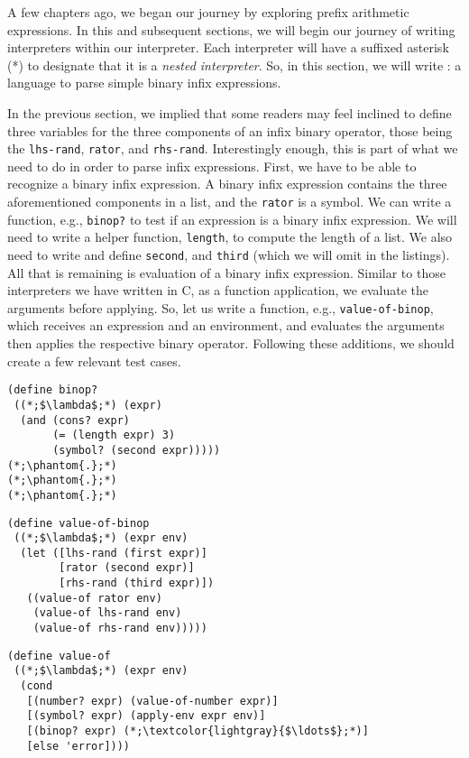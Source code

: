 A few chapters ago, we began our journey by exploring prefix arithmetic expressions. In this and subsequent sections, we will begin our journey of writing interpreters within our interpreter. Each interpreter will have a suffixed asterisk (*) to designate that it is a \textit{nested interpreter}. So, in this section, we will write : a language to parse simple binary infix expressions.

In the previous section, we implied that some readers may feel inclined to define three variables for the three components of an infix binary operator, those being the \texttt{lhs-rand}, \texttt{rator}, and \texttt{rhs-rand}. Interestingly enough, this is part of what we need to do in order to parse infix expressions. First, we have to be able to recognize a binary infix expression. A binary infix expression contains the three aforementioned components in a list, and the \texttt{rator} is a symbol. We can write a function, e.g., \texttt{binop?} to test if an expression is a binary infix expression. We will need to write a helper function, \texttt{length}, to compute the length of a list. We also need to write and define \texttt{second}, and \texttt{third} (which we will omit in the listings). All that is remaining is evaluation of a binary infix expression. Similar to those interpreters we have written in C, as a function application, we evaluate the arguments before applying. So, let us write a function, e.g., \texttt{value-of-binop}, which receives an expression and an environment, and evaluates the arguments then applies the respective binary operator. Following these additions, we should create a few relevant test cases.

\begin{clrr}[]{}\begin{lstlisting}[language=MyScheme]
(define binop?
 ((*;$\lambda$;*) (expr)
  (and (cons? expr) 
       (= (length expr) 3) 
       (symbol? (second expr)))))
(*;\phantom{.};*)
(*;\phantom{.};*)
(*;\phantom{.};*)
\end{lstlisting}
\tcblower
\begin{lstlisting}[language=MyNLNScheme]
(define value-of-binop
 ((*;$\lambda$;*) (expr env)
  (let ([lhs-rand (first expr)]
        [rator (second expr)]
        [rhs-rand (third expr)])
   ((value-of rator env)
    (value-of lhs-rand env)
    (value-of rhs-rand env)))))
\end{lstlisting}
\end{clrr}
\begin{cl}[]{}\begin{lstlisting}[language=MyScheme]
(define value-of
 ((*;$\lambda$;*) (expr env)
  (cond
   [(number? expr) (value-of-number expr)]
   [(symbol? expr) (apply-env expr env)]
   [(binop? expr) (*;\textcolor{lightgray}{$\ldots$};*)]
   [else 'error])))
\end{lstlisting}\end{cl}

